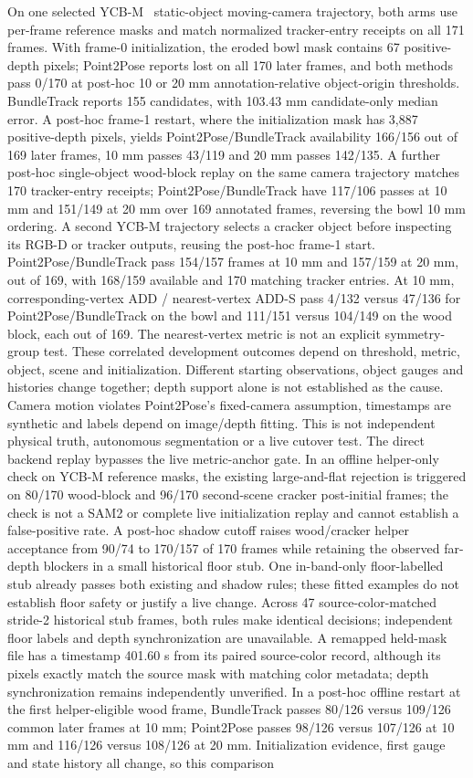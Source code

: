 \documentclass[10pt,journal]{IEEEtran}
\begin{document}
On one selected YCB-M~\cite{ycbm} static-object moving-camera trajectory, both arms use per-frame reference masks and match normalized tracker-entry receipts on all 171 frames. With frame-0 initialization, the eroded bowl mask contains 67 positive-depth pixels; Point2Pose reports lost on all 170 later frames, and both methods pass 0/170 at post-hoc 10 or 20 mm annotation-relative object-origin thresholds. BundleTrack reports 155 candidates, with 103.43 mm candidate-only median error. A post-hoc frame-1 restart, where the initialization mask has 3,887 positive-depth pixels, yields Point2Pose/BundleTrack availability 166/156 out of 169 later frames, 10 mm passes 43/119 and 20 mm passes 142/135. A further post-hoc single-object wood-block replay on the same camera trajectory matches 170 tracker-entry receipts; Point2Pose/BundleTrack have 117/106 passes at 10 mm and 151/149 at 20 mm over 169 annotated frames, reversing the bowl 10 mm ordering. A second YCB-M trajectory selects a cracker object before inspecting its RGB-D or tracker outputs, reusing the post-hoc frame-1 start. Point2Pose/BundleTrack pass 154/157 frames at 10 mm and 157/159 at 20 mm, out of 169, with 168/159 available and 170 matching tracker entries. At 10 mm, corresponding-vertex ADD / nearest-vertex ADD-S pass 4/132 versus 47/136 for Point2Pose/BundleTrack on the bowl and 111/151 versus 104/149 on the wood block, each out of 169. The nearest-vertex metric is not an explicit symmetry-group test. These correlated development outcomes depend on threshold, metric, object, scene and initialization. Different starting observations, object gauges and histories change together; depth support alone is not established as the cause. Camera motion violates Point2Pose's fixed-camera assumption, timestamps are synthetic and labels depend on image/depth fitting. This is not independent physical truth, autonomous segmentation or a live cutover test. The direct backend replay bypasses the live metric-anchor gate. In an offline helper-only check on YCB-M reference masks, the existing large-and-flat rejection is triggered on 80/170 wood-block and 96/170 second-scene cracker post-initial frames; the check is not a SAM2 or complete live initialization replay and cannot establish a false-positive rate. A post-hoc shadow cutoff raises wood/cracker helper acceptance from 90/74 to 170/157 of 170 frames while retaining the observed far-depth blockers in a small historical floor stub. One in-band-only floor-labelled stub already passes both existing and shadow rules; these fitted examples do not establish floor safety or justify a live change. Across 47 source-color-matched stride-2 historical stub frames, both rules make identical decisions; independent floor labels and depth synchronization are unavailable. A remapped held-mask file has a timestamp 401.60 s from its paired source-color record, although its pixels exactly match the source mask with matching color metadata; depth synchronization remains independently unverified. In a post-hoc offline restart at the first helper-eligible wood frame, BundleTrack passes 80/126 versus 109/126 common later frames at 10 mm; Point2Pose passes 98/126 versus 107/126 at 10 mm and 116/126 versus 108/126 at 20 mm. Initialization evidence, first gauge and state history all change, so this comparison 
\end{document}
